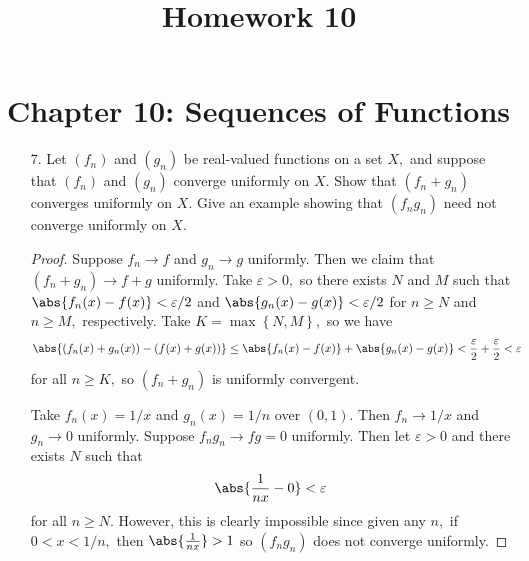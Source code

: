 \documentclass{article}
\begin{document}
\title{Homework 10}
\maketitle
\thispagestyle{fancy}

\section*{Chapter 10: Sequences of Functions}

\begin{itemize} 
	\item[7.] Let $(f_n)$ and $(g_n)$ be real-valued functions on a set $X,$ and suppose that $(f_n)$ and $(g_n)$ converge uniformly on $X.$ Show that $(f_ n+g_n)$ converges uniformly on $X.$ Give an example showing that $(f_ng_n)$ need not converge uniformly on $X.$
		\begin{proof}
			Suppose $f_n\to f$ and $g_n\to g$ uniformly. Then we claim that $(f_n+g_n)\to f+g$ uniformly. Take $\varepsilon>0,$ so there exists $N$ and $M$ such that $\abs{f_n(x)-f(x)}<\varepsilon/2$ and $\abs{g_n(x)-g(x)}<\varepsilon/2$ for $n\ge N$ and $n\ge M,$ respectively. Take $K=\max\left\{ N, M \right\},$ so we have
			\begin{align*}
				\abs{(f_n(x)+g_n(x))-(f(x)+g(x))} &\le \abs{f_n(x)-f(x)} + \abs{g_n(x)-g(x)} < \frac{\varepsilon}{2} + \frac{\varepsilon}{2} < \varepsilon
			\end{align*}
			for all $n\ge K,$ so $(f_n+g_n)$ is uniformly convergent.

			Take $f_n(x)=1/x$ and $g_n(x)=1/n$ over $(0, 1).$ Then $f_n\to 1/x$ and $g_n\to 0$ uniformly. Suppose $f_ng_n\to fg=0$ uniformly. Then let $\varepsilon>0$ and there exists $N$ such that
			\begin{align*}
				\abs{\frac{1}{nx}-0}<\varepsilon
			\end{align*}
			for all $n\ge N.$ However, this is clearly impossible since given any $n,$ if $0<x<1/n,$ then $\abs{\frac{1}{nx}}>1$ so $(f_ng_n)$ does not converge uniformly.
		\end{proof}


\end{itemize}
\end{document}
